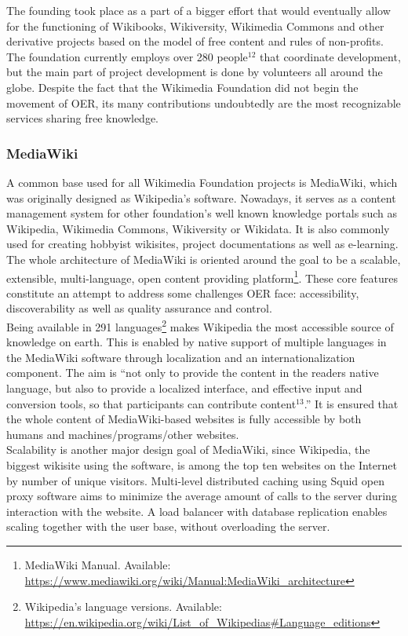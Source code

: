\documentclass[a4paper]{article}
\begin{document}
\noindent
The founding took place as a part of a bigger effort that would eventually allow for the functioning of Wikibooks, Wikiversity, Wikimedia Commons and other derivative projects based on the model of free content and rules of non-profits. The foundation currently employs over 280 people$^{12}$ that coordinate development, but the main part of project development is done by volunteers all around the globe. Despite the fact that the Wikimedia Foundation did not begin the movement of OER, its many contributions undoubtedly are the most recognizable services sharing free knowledge.
\subsubsection{MediaWiki}
A common base used for all Wikimedia Foundation projects is MediaWiki, which was originally designed as Wikipedia's software. Nowadays, it serves as a content management system for other foundation's well known knowledge portals such as Wikipedia, Wikimedia Commons, Wikiversity or Wikidata. It is also commonly used for creating hobbyist wikisites, project documentations as well as e-learning. \\ 

\noindent
The whole architecture of MediaWiki is oriented around the goal to be a scalable, extensible, multi-language, open content providing platform\footnote{MediaWiki Manual. Available: \url{https://www.mediawiki.org/wiki/Manual:MediaWiki_architecture}}. These core features constitute an attempt to address some challenges OER face: accessibility, discoverability as well as quality assurance and control.\\

\noindent
Being available in 291 languages\footnote{Wikipedia's language versions. Available: \url{https://en.wikipedia.org/wiki/List_of_Wikipedias#Language_editions}} makes Wikipedia the most accessible source of knowledge on earth. This is enabled by native support of multiple languages in the MediaWiki software through localization and an internationalization component. The aim is ``not only to provide the content in the readers native language, but also to provide a localized interface, and effective input and conversion tools, so that participants can contribute content$^{13}$.'' It is ensured that the whole content of MediaWiki-based websites is fully accessible by both humans and machines/programs/other websites.\\

\noindent
Scalability is another major design goal of MediaWiki, since Wikipedia, the biggest wikisite using the software, is among the top ten websites on the Internet by number of unique visitors. Multi-level distributed caching using Squid open proxy software aims to minimize the average amount of calls to the server during interaction with the website. A load balancer with database replication enables scaling together with the user base, without overloading the server.\\
\end{document}
